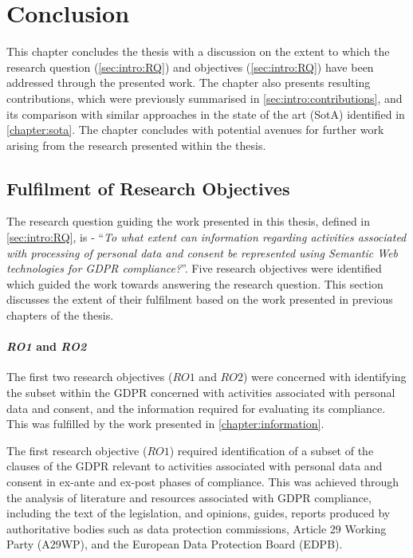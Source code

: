 \chapter{Conclusion}\label{chapter:conclusion}
This chapter concludes the thesis with a discussion on the extent to which the research question (\autoref{sec:intro:RQ}) and objectives (\autoref{sec:intro:RQ}) have been addressed through the presented work. The chapter also presents resulting contributions,  which were previously summarised in \autoref{sec:intro:contributions}, and its comparison with similar approaches in the state of the art (SotA) identified in \autoref{chapter:sota}. The chapter concludes with potential avenues for further work arising from the research presented within the thesis.

\section{Fulfilment of Research Objectives}\label{sec:conclusion-RO}
The research question guiding the work presented in this thesis, defined in \autoref{sec:intro:RQ}, is - ``\textit{To what extent can information regarding activities associated with processing of personal data and consent be represented using Semantic Web technologies for GDPR compliance?}''.
Five research objectives were identified which guided the work towards answering the research question.
This section discusses the extent of their fulfilment based on the work presented in previous chapters of the thesis.

\subsubsection*{\textit{RO1} and \textit{RO2}}
The first two research objectives ($RO1$ and $RO2$) were concerned with identifying the subset within the GDPR concerned with activities associated with personal data and consent, and the information required for evaluating its compliance. This was fulfilled by the work presented in \autoref{chapter:information}.

The first research objective ($RO1$) required identification of a subset of the clauses of the GDPR relevant to activities associated with personal data and consent in ex-ante and ex-post phases of compliance. 
This was achieved through the analysis of literature and resources associated with GDPR compliance, including the text of the legislation, and opinions, guides, reports produced by authoritative bodies such as data protection commissions, Article 29 Working Party (A29WP), and the European Data Protection Board (EDPB).

